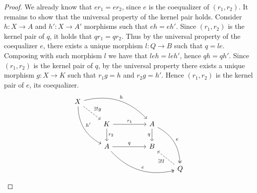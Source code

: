 \begin{subbox}{}
\begin{proof}
    We already know that $er_1=er_2$, since $e$ is the coequalizer of $(r_1,r_2)$. It remains to show that the universal property of the kernel pair holds. Consider $h: X \to A$ and $h' : X \to A'$ morphisms such that $eh=eh'$. Since $(r_1,r_2)$ is the kernel pair of $q$, it holds that $qr_1=qr_2$. Thus by the universal property of the coequalizer $e$, there exists a unique morphism $l:Q \to B$ such that $q=le$. Composing with such morphism $l$ we have that $leh=leh'$, hence $qh=qh'$. Since $(r_1,r_2)$ is the kernel pair of $q$, by the universal property there exists a unique morphism $g: X \to K$ such that $r_1g=h$ and $r_2g=h'$. Hence $(r_1,r_2)$ is the kernel pair of $e$, its coequalizer.
    \[
\begin{tikzcd}
    X \arrow[rd, "\exists!  g", dashed] \arrow[rrrd, "h", bend left] \arrow[rdd, "h'", bend right] &                                                            &  &                                                          &                                    \\
                                                                                                   & K \arrow[rr, "r_1"] \arrow[d, "r_2"]                       &  & A \arrow[d, "q"'] \arrow[rdd, "e", two heads, bend left] &                                    \\
                                                                                                   & A \arrow[rr, "q"] \arrow[rrrd, "e", two heads, bend right] &  & B                                                        &                                    \\
                                                                                                   &                                                            &  &                                                          & Q \arrow[lu, "\exists! l", dashed]
    \end{tikzcd}
    \]
    \end{proof}
\end{subbox}

